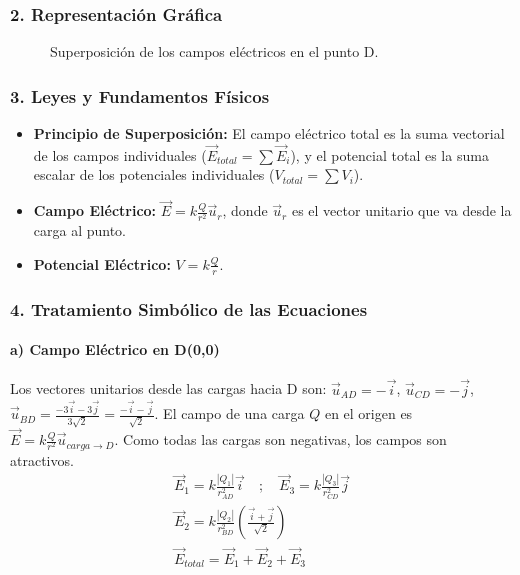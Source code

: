\subsubsection*{2. Representación Gráfica}
\begin{figure}[H]
    \centering
    \caption{Superposición de los campos eléctricos en el punto D.}
\end{figure}

\subsubsection*{3. Leyes y Fundamentos Físicos}
\begin{itemize}
    \item \textbf{Principio de Superposición:} El campo eléctrico total es la suma vectorial de los campos individuales ($\vec{E}_{total}=\sum \vec{E}_i$), y el potencial total es la suma escalar de los potenciales individuales ($V_{total}=\sum V_i$).
    \item \textbf{Campo Eléctrico:} $\vec{E} = k\frac{Q}{r^2}\vec{u}_r$, donde $\vec{u}_r$ es el vector unitario que va desde la carga al punto.
    \item \textbf{Potencial Eléctrico:} $V = k\frac{Q}{r}$.
\end{itemize}

\subsubsection*{4. Tratamiento Simbólico de las Ecuaciones}
\paragraph*{a) Campo Eléctrico en D(0,0)}
Los vectores unitarios desde las cargas hacia D son: $\vec{u}_{AD}=-\vec{i}$, $\vec{u}_{CD}=-\vec{j}$, $\vec{u}_{BD} = \frac{-3\vec{i}-3\vec{j}}{3\sqrt{2}} = \frac{-\vec{i}-\vec{j}}{\sqrt{2}}$.
El campo de una carga $Q$ en el origen es $\vec{E} = k\frac{Q}{r^2}\vec{u}_{carga \to D}$. Como todas las cargas son negativas, los campos son atractivos.
\begin{gather}
    \vec{E}_1 = k\frac{|Q_1|}{r_{AD}^2}\vec{i} \quad ; \quad \vec{E}_3 = k\frac{|Q_3|}{r_{CD}^2}\vec{j} \\
    \vec{E}_2 = k\frac{|Q_2|}{r_{BD}^2}\left(\frac{\vec{i}+\vec{j}}{\sqrt{2}}\right) \\
    \vec{E}_{total} = \vec{E}_1 + \vec{E}_2 + \vec{E}_3
\end{gather}

